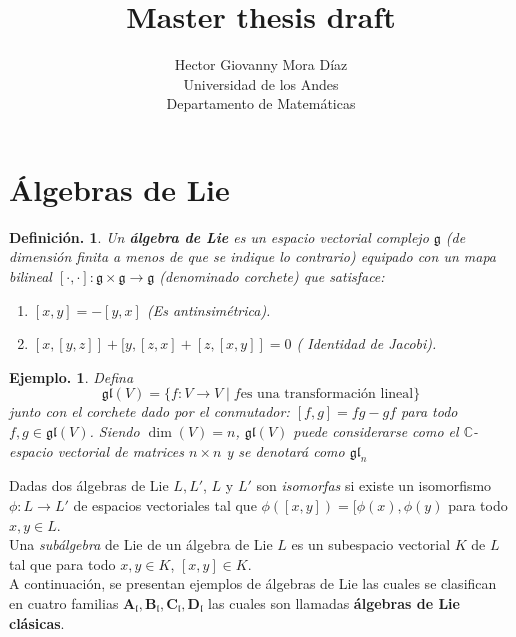 \documentclass[11pt,a4paper]{article}
\author{ Hector Giovanny Mora Díaz\\
\small Universidad de los Andes\\
\small Departamento de Matemáticas\\}
\title{Master thesis draft}
\newtheorem{definition}{Definici\'on.}
\newtheorem{example}{Ejemplo.}
\newcommand{\suchthat}{\mid}
\begin{document}
\maketitle
\section{Álgebras de Lie }


 \begin{definition} Un \textbf{álgebra de Lie} es un espacio vectorial complejo $\mathfrak{g}$ (de dimensión finita a menos de que se indique lo contrario) equipado con un mapa bilineal $[\cdot, \cdot]: \mathfrak{g}\times \mathfrak{g}\rightarrow \mathfrak{g}$ (denominado corchete) que satisface: 
 \begin{enumerate}
     \item $[x,y]=-[y,x]$ (Es antinsimétrica).
     \item $[x,[y,z]]+[y,[z,x] +[z, [x,y]]=0$ ( Identidad de Jacobi).
 \end{enumerate}

\end{definition}
\begin{example}

    Defina $$\mathfrak{gl}(V)=  \{ f: V\rightarrow V \suchthat f \mbox{es una transformación lineal} \} $$
    junto con el corchete dado por el conmutador: $[f,g]= fg-gf$ para todo $f,g \in \mathfrak{gl}(V)$. Siendo $\dim(V)=n$, $\mathfrak{gl}(V)$ puede considerarse como el $\mathbb{C}$-espacio vectorial de matrices $n\times n$ y se denotará como $\mathfrak{gl}_n$

\end{example}
Dadas dos álgebras de Lie $L, L'$, $L$ y $L'$ son \textit{isomorfas}  si existe un isomorfismo $\phi:L \rightarrow L' $ de espacios vectoriales tal que $\phi([x,y])= [\phi(x), \phi(y)$ para todo $x,y \in L$.\\
Una \textit{subálgebra} de Lie de un álgebra de Lie $L$ es un subespacio vectorial $K$ de $L$ tal que para todo $x,y\in K$, $[x,y] \in K$. \\
A continuación, se presentan ejemplos de álgebras de Lie las cuales se clasifican en cuatro familias $\mathbf{A}_\mathfrak{l},\mathbf{B}_\mathfrak{l}, \mathbf{C}_\mathfrak{l}, \mathbf{D}_\mathfrak{l}$ las cuales son llamadas \textbf{álgebras de Lie clásicas}.
\end{document}
